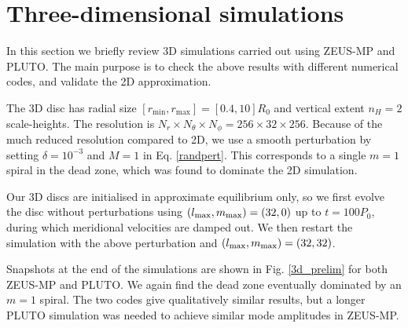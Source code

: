 \section{Three-dimensional simulations}
In this section we briefly review 3D simulations carried 
out using ZEUS-MP and PLUTO. The main purpose is to check 
the above results with different numerical codes, and validate  
the 2D approximation.    

The 3D disc has radial size
$[r_\mathrm{min},r_\mathrm{max}]=[0.4,10]R_0$ and vertical extent 
$n_H=2$ scale-heights. The resolution is $N_r\times N_\theta\times
N_\phi=256\times32\times256$. Because of the much reduced resolution
compared to 2D, we use a smooth perturbation by setting
$\delta = 10^{-3}$ and $M=1$ in Eq. \ref{randpert}. This corresponds
to a single $m=1$ spiral in the dead zone, which was found to dominate
the 2D simulation.  

Our 3D discs are initialised in approximate equilibrium only, so we
first evolve the disc without perturbations using  
$(l_\mathrm{max},m_\mathrm{max})=(32,0)$ up to $t=100P_0$, during which 
meridional velocities are damped out. We then restart the simulation
with the above perturbation and $(l_\mathrm{max},m_\mathrm{max})=(32,32)$. 





Snapshots at the end of the simulations are shown in
Fig. \ref{3d_prelim} for both ZEUS-MP and PLUTO. We again find the dead zone eventually
dominated by an $m=1$ spiral. %
The two codes give qualitatively similar results, but a longer PLUTO simulation was
needed to achieve similar mode amplitudes in ZEUS-MP. 


